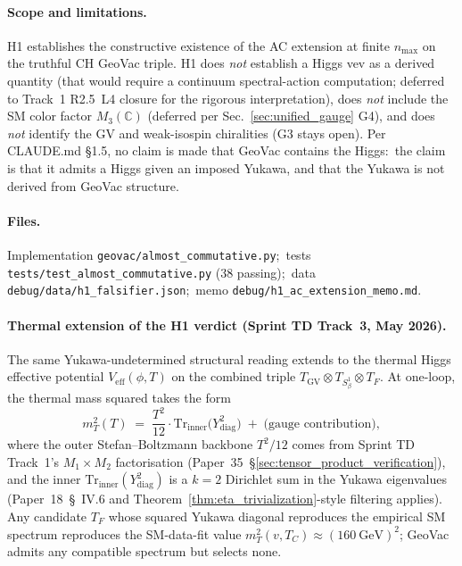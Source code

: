 \documentclass[11pt]{article}
\begin{document}
\paragraph{Scope and limitations.}  H1 establishes the
constructive existence of the AC extension at finite $n_{\max}$
on the truthful CH GeoVac triple.  H1 does \emph{not} establish a
Higgs vev as a derived quantity (that would require a continuum
spectral-action computation; deferred to Track~1 R2.5~L4
closure for the rigorous interpretation), does \emph{not} include
the SM color factor $M_3(\mathbb{C})$ (deferred per
Sec.~\ref{sec:unified_gauge} G4), and does \emph{not} identify the
GV and weak-isospin chiralities (G3 stays open).  Per CLAUDE.md
\S 1.5, no claim is made that GeoVac contains the Higgs:\ the
claim is that it admits a Higgs given an imposed Yukawa, and that
the Yukawa is not derived from GeoVac structure.

\paragraph{Files.}  Implementation
\texttt{geovac/almost\_commutative.py};\ tests
\texttt{tests/test\_almost\_commutative.py} (38 passing);\ data
\texttt{debug/data/h1\_falsifier.json};\ memo
\texttt{debug/h1\_ac\_extension\_memo.md}.

\paragraph{Thermal extension of the H1 verdict (Sprint TD Track~3,
May 2026).}
The same Yukawa-undetermined structural reading extends to the
thermal Higgs effective potential $V_{\mathrm{eff}}(\phi, T)$ on the
combined triple $T_{\mathrm{GV}} \otimes T_{S^1_\beta} \otimes T_F$.
At one-loop, the thermal mass squared takes the form
\[
  m_T^2(T) \;=\; \frac{T^2}{12} \cdot \mathrm{Tr}_{\mathrm{inner}}\bigl(Y_{\mathrm{diag}}^2\bigr)
                \;+\;\text{(gauge contribution)},
\]
where the outer Stefan--Boltzmann backbone $T^2 / 12$ comes from
Sprint TD Track~1's $M_1 \times M_2$ factorisation
(Paper~35~\S\ref{sec:tensor_product_verification}), and the inner
$\mathrm{Tr}_{\mathrm{inner}}(Y_{\mathrm{diag}}^2)$ is a $k=2$
Dirichlet sum in the Yukawa eigenvalues
(Paper~18~\S~IV.6 and Theorem~\ref{thm:eta_trivialization}-style
filtering applies).  Any candidate $T_F$ whose squared Yukawa
diagonal reproduces the empirical SM spectrum reproduces the
SM-data-fit value $m_T^2(v, T_C) \approx (160~\mathrm{GeV})^2$;
GeoVac admits any compatible spectrum but selects none.
\end{document}
